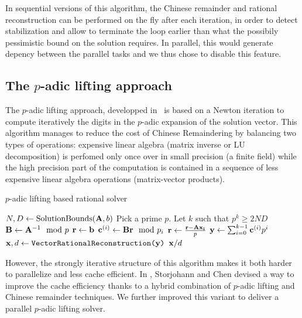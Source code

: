 In sequential versions of this algorithm, the Chinese remainder and rational reconstruction can be performed on the fly
after each iteration, in order to detect stabilization and allow to terminate the loop earlier than what the possibily
pessimistic bound on the solution requires. In parallel, this would generate depency between the parallel tasks and we
thus chose to disable this feature.


\subsection{The $p$-adic lifting approach}

The $p$-adic lifting approach, developped in~\cite{Dix82} is based on a Newton iteration to compute iteratively the
digits in the $p$-adic expansion of the solution vector. This algorithm manages to reduce the cost of Chinese Remaindering
by balancing two types of operations: expensive linear algebra (matrix inverse or LU decomposition) is
perfomed only once over in small precision (a finite field) while the high precision part of the computation is
contained in a sequence of less expensive linear algebra operations (matrix-vector products).
\begin{algorithm}[htb]
  \caption{$p$-adic lifting based rational solver}
  \begin{algorithmic}[1]
    \State $N,D \leftarrow \text{SolutionBounds}(\mathbf{A},b)$
    \State Pick a prime $p$. Let $k$ such that $p^k \geq 2ND$
    \State $\mathbf{B}\leftarrow \mathbf{A}^{-1} \mod p$
    \State $\mathbf{r}\leftarrow \mathbf{b}$
    \State $\mathbf{c}^{(i)}  \leftarrow \mathbf{B} \mathbf{r} \mod p_i$
    \State $\mathbf{r} \leftarrow  \frac{\mathbf{r} - \mathbf{A}\mathbf{x_i}}{p}$
    \EndFor
    \State $\mathbf{y} \leftarrow \sum_{i=0}^{k-1} \mathbf{c}^{(i)} p^i$
    \State $\mathbf{x},d\leftarrow \texttt{VectorRationalReconstruction(\ensuremath{\mathbf{y}})}$
  \State \Return $\mathbf{x}/d$
\end{algorithmic}
\end{algorithm}

However, the strongly iterative structure of this algorithm makes it both harder to parallelize and less cache
efficient.
In \cite{ChSt05}, Storjohann and Chen devised a way to improve the cache efficiency thanks to a hybrid combination of
$p$-adic lifting and Chinese remainder techniques.
We further improved this variant to deliver a parallel $p$-adic lifting solver. 

